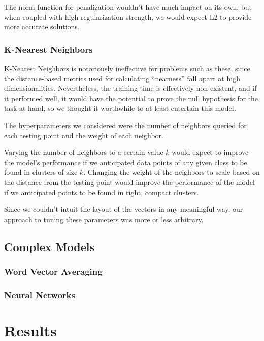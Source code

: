 \documentclass[conference]{IEEEtran}
\begin{document}
The norm function for penalization wouldn't have much impact on its own, but when coupled with high regularization strength, we would expect L2 to provide more accurate solutions.

\subsubsection{K-Nearest Neighbors}

K-Nearest Neighbors is notoriously ineffective for problems such as these, since the distance-based metrics used for calculating ``nearness'' fall apart at high dimensionalities. Nevertheless, the training time is effectively non-existent, and if it performed well, it would have the potential to prove the null hypothesis for the task at hand, so we thought it worthwhile to at least entertain this model.

The hyperparameters we considered were the number of neighbors queried for each testing point and the weight of each neighbor. 

Varying the number of neighbors to a certain value $k$ would expect to improve the model's performance if we anticipated data points of any given class to be found in clusters of size $k$. Changing the weight of the neighbors to scale based on the distance from the testing point would improve the performance of the model if we anticipated points to be found in tight, compact clusters.

Since we couldn't intuit the layout of the vectors in any meaningful way, our approach to tuning these parameters was more or less arbitrary.

\subsection{Complex Models}


\subsubsection{Word Vector Averaging}


\subsubsection{Neural Networks}

\section{Results}
\end{document}
